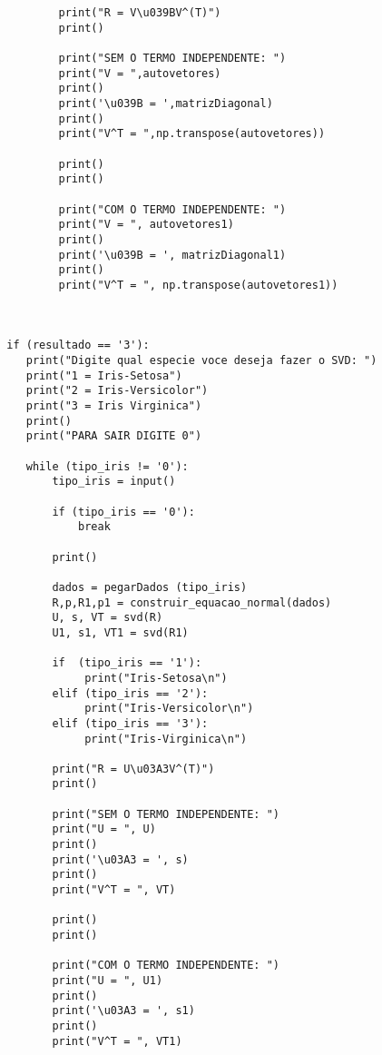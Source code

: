 \documentclass[a4paper,12pt,twoside]{article}
\begin{document}
\begin{lstlisting}
                print("R = V\u039BV^(T)")
                print()
                
                print("SEM O TERMO INDEPENDENTE: ")
                print("V = ",autovetores)
                print()
                print('\u039B = ',matrizDiagonal)
                print()
                print("V^T = ",np.transpose(autovetores))
                
                print()
                print()
                
                print("COM O TERMO INDEPENDENTE: ")
                print("V = ", autovetores1)
                print()
                print('\u039B = ', matrizDiagonal1)
                print()
                print("V^T = ", np.transpose(autovetores1))
                
        
        
        if (resultado == '3'):
           print("Digite qual especie voce deseja fazer o SVD: ")
           print("1 = Iris-Setosa")
           print("2 = Iris-Versicolor")
           print("3 = Iris Virginica")
           print()
           print("PARA SAIR DIGITE 0")
            
           while (tipo_iris != '0'):        
               tipo_iris = input()
                
               if (tipo_iris == '0'):
                   break
                    
               print()
                
               dados = pegarDados (tipo_iris)
               R,p,R1,p1 = construir_equacao_normal(dados)
               U, s, VT = svd(R)
               U1, s1, VT1 = svd(R1)
               
               if  (tipo_iris == '1'):
                    print("Iris-Setosa\n")
               elif (tipo_iris == '2'):
                    print("Iris-Versicolor\n")
               elif (tipo_iris == '3'):
                    print("Iris-Virginica\n")
                    
               print("R = U\u03A3V^(T)")
               print()
               
               print("SEM O TERMO INDEPENDENTE: ")
               print("U = ", U)
               print()
               print('\u03A3 = ', s)
               print()
               print("V^T = ", VT)
                
               print()
               print()
                
               print("COM O TERMO INDEPENDENTE: ")
               print("U = ", U1)
               print()
               print('\u03A3 = ', s1)
               print()
               print("V^T = ", VT1)
                

\end{lstlisting}
\end{document}
